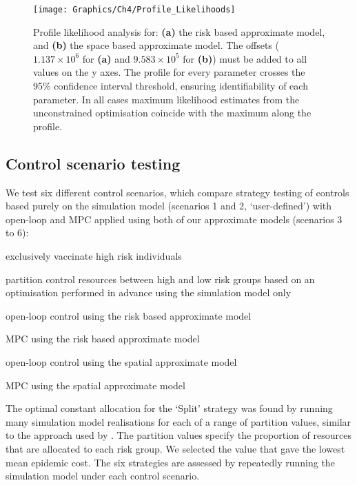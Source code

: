 \begin{figure}
    \begin{center}
        \texttt{[image: Graphics/Ch4/Profile\_Likelihoods]}
        \caption[Profile likelihood analysis for the approximate models]{Profile likelihood analysis for: \textbf{(a)} the risk based approximate model, and \textbf{(b)} the space based approximate model. The offsets ($1.137\times10^6$ for \textbf{(a)} and $9.583\times10^5$ for \textbf{(b)}) must be added to all values on the y axes. The profile for every parameter crosses the 95\% confidence interval threshold, ensuring identifiability of each parameter. In all cases maximum likelihood estimates from the unconstrained optimisation coincide with the maximum along the profile.}
        \label{fig:profile_lik}
    \end{center}
\end{figure}

\FloatBarrier
\subsection{Control scenario testing}

We test six different control scenarios, which compare strategy testing of controls based purely on the simulation model (scenarios 1 and 2, `user-defined') with open-loop and MPC applied using both of our approximate models (scenarios 3 to 6):
\begin{description}
    \setlength{\itemsep}{3pt}%
    \setlength{\parskip}{3pt}%
    \setlength{\parsep}{3pt}%
    \item[1. `High':] exclusively vaccinate high risk individuals
    \item[2. `Split':] partition control resources between high and low risk groups based on an optimisation performed in advance using the simulation model only
    \item[3. `Risk OL':] open-loop control using the risk based approximate model
    \item[4. `Risk MPC':] MPC using the risk based approximate model
    \item[5. `Space OL':] open-loop control using the spatial approximate model
    \item[6. `Space MPC':] MPC using the spatial approximate model
\end{description}

The optimal constant allocation for the `Split' strategy was found by running many simulation model realisations for each of a range of partition values, similar to the approach used by \citet{cunniffe_optimising_2015}. The partition values specify the proportion of resources that are allocated to each risk group. We selected the value that gave the lowest mean epidemic cost. The six strategies are assessed by repeatedly running the simulation model under each control scenario.

